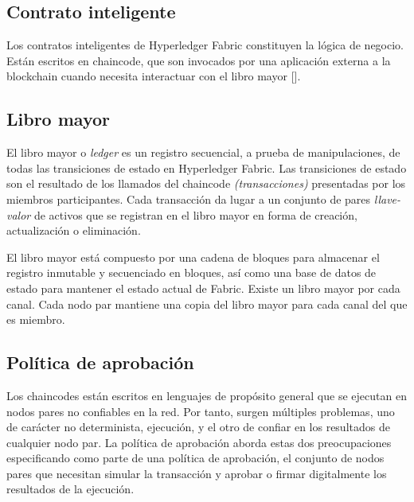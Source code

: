 \subsection{Contrato inteligente}
Los contratos inteligentes de Hyperledger Fabric constituyen la l\'ogica de negocio. Est\'an escritos en chaincode, que son invocados por una aplicaci\'on externa a la blockchain cuando necesita interactuar con el libro mayor [\cite{SmartContract}].


\subsection{Libro mayor}
El libro mayor o \emph{ledger} es un registro secuencial, a prueba de manipulaciones, de todas las transiciones de estado en Hyperledger Fabric. Las transiciones de estado son el resultado de los llamados del chaincode \emph{(transacciones)} presentadas por los miembros participantes. Cada transacci\'on da lugar a un conjunto de pares \emph{llave-valor} de activos que se registran en el libro mayor en forma de creaci\'on, actualizaci\'on o eliminaci\'on.

El libro mayor est\'a compuesto por una cadena de bloques para almacenar el registro inmutable y secuenciado en bloques, as\'i como una base de datos de estado para mantener el estado actual de Fabric. Existe un libro mayor por cada canal. Cada nodo par mantiene una copia del libro mayor para cada canal del que es miembro.

\subsection{Pol\'itica de aprobaci\'on}
Los chaincodes est\'an escritos en lenguajes de prop\'osito general que se ejecutan en nodos pares no confiables en la red. Por tanto, surgen m\'ultiples problemas, uno de car\'acter no determinista, ejecuci\'on, y el otro de confiar en los resultados de cualquier nodo par. La pol\'itica de aprobaci\'on aborda estas dos preocupaciones especificando como parte de una pol\'itica de aprobaci\'on, el conjunto de nodos pares que necesitan simular la transacci\'on y aprobar o firmar digitalmente los resultados de la ejecuci\'on.

